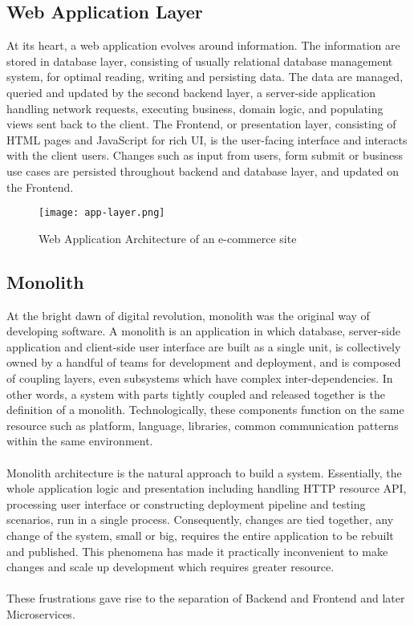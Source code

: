 \documentclass[a4paper]{book}
\begin{document}
\subsection{Web Application Layer}
At its heart, a web application evolves around information. The information are stored in database layer, consisting of usually relational database management system,  for optimal reading, writing and persisting data. The data are managed, queried and updated by the second backend layer, a server-side application handling network requests, executing business, domain logic, and populating views sent back to the client. The Frontend, or presentation layer, consisting of HTML pages and JavaScript for rich UI, is the user-facing interface and interacts with the client users. Changes such as input from users, form submit or business use cases are persisted throughout backend and database layer, and updated on the Frontend. 
\begin{figure}
    \centering
    \texttt{[image: app-layer.png]}
    \caption{Web Application Architecture of an e-commerce site \cite{micro-frontends.org}}
    \label{fig:my_label}
\end{figure}

\subsection{Monolith}

At the bright dawn of digital revolution, monolith was the original way of developing software. A monolith is an application in which database, server-side application and client-side user interface are built as a single unit, is collectively owned by a handful of teams for development and deployment, and is composed of coupling layers, even subsystems which have complex inter-dependencies. In other words, a system with parts tightly coupled and released together is the definition of a monolith. Technologically, these components function on the same resource such as platform, language, libraries, common communication patterns within the same environment.
\\ \\ 
Monolith architecture is the natural approach to build a system. Essentially, the whole application logic and presentation including handling HTTP resource API, processing user interface or constructing deployment pipeline and testing scenarios, run in a single process. Consequently, changes are tied together, any change of the system, small or big, requires the entire application to be rebuilt and published. This phenomena has made it practically inconvenient to make changes and scale up development which requires greater resource. 
\\ \\
These frustrations gave rise to the separation of Backend and Frontend and later Microservices.
\end{document}
